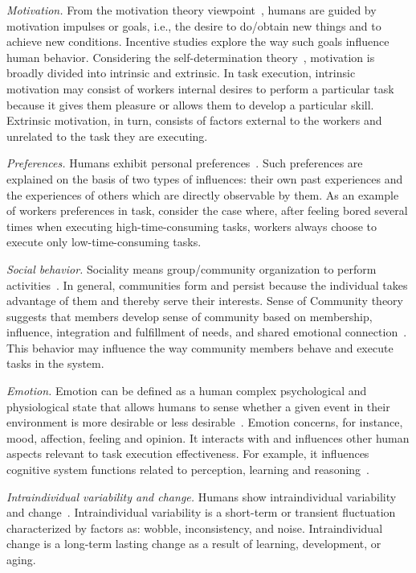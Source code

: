 \documentclass[11pt]{bmc_article_s50}
\begin{document}
\textit{Motivation.} From the motivation theory viewpoint~\cite{Maslow:1943}, humans are guided by motivation impulses or goals, i.e., the desire to do/obtain new things and to achieve new conditions. Incentive studies explore the way such goals influence human behavior. Considering the self-determination theory~\cite{Deci:book:1985}, motivation is broadly divided into intrinsic and extrinsic. In task execution, intrinsic motivation may consist of workers internal desires to perform a particular task because it gives them pleasure or allows them to develop a particular skill. Extrinsic motivation, in turn, consists of factors external to the workers and unrelated to the task they are executing.

\textit{Preferences.} Humans exhibit personal preferences~\cite{Kapteyn:1978}. Such preferences are explained on the basis of two types of influences: their own past experiences and the experiences of others which are directly observable by them. As an example of workers preferences in task, consider the case where, after feeling bored several times when executing high-time-consuming tasks, workers always choose to execute only low-time-consuming tasks.

\textit{Social behavior.} Sociality means group/community organization to perform activities~\cite{coleman:book:2000}. In general, communities form and persist because the individual takes advantage of them and thereby serve their interests. Sense of Community theory suggests that members develop sense of community based on membership, influence, integration and fulfillment of needs, and shared emotional connection~\cite{mcmillan:JCP:1996}. This behavior may influence the way community members behave and execute tasks in the system.

\textit{Emotion.} Emotion can be defined as a human complex psychological and physiological state that allows humans to sense whether a given event in their environment is more desirable or less desirable~\cite{Dolan:2002}. Emotion concerns, for instance, mood, affection, feeling and opinion. It interacts with and influences other human aspects relevant to task execution effectiveness. For example, it influences cognitive system functions related to perception, learning and reasoning~\cite{Dolan:2002}.{\pagebreak} 

\textit{Intraindividual variability and change.} Humans show intraindividual variability and change~\cite{Ram:2005}. Intraindividual variability is a short-term or transient fluctuation characterized by factors as: wobble, inconsistency, and noise. Intraindividual change is a long-term lasting change as a result of learning, development, or aging.
\end{document}
